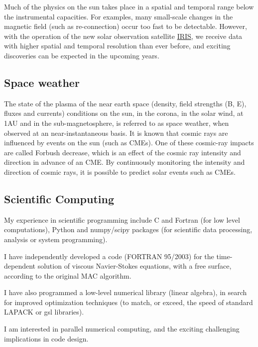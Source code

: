 Much of the physics on the sun takes place in a spatial and temporal range below the instrumental capacities. For examples, many small-scale changes in the magnetic field (such as re-connection) occur too fast to be detectable. However, with the operation of the new solar observation satellite \href{http://link.springer.com/article/10.1007%2Fs11207-014-0485-y}{IRIS}, we receive data with higher spatial and temporal resolution than ever before, and exciting discoveries can be expected in the upcoming years.

\subsection{Space weather}
The state of the plasma of the near earth space (density, field strengths (B, E), fluxes and currents) conditions on the sun, in the corona, in the solar wind, at 1AU and in the sub-magnetosphere, is referred to as space weather, when observed at an near-instantaneous basis. It is known that cosmic rays are influenced by events on the sun (such as CMEs). One of these cosmic-ray impacts are called Forbush decrease, which is an effect of the cosmic ray intensity and direction in advance of an CME. By continuously monitoring the intensity and direction of cosmic rays, it is possible to predict solar events such as CMEs.

\subsection{Scientific Computing}
My experience in scientific programming include C and Fortran (for low level computations), Python and numpy/scipy packages (for scientific data processing, analysis or system programming).

I have independently developed a code (FORTRAN 95/2003) for the time-dependent solution of viscous Navier-Stokes equations, with a free surface, according to the original MAC algorithm.

I have also programmed a low-level numerical library (linear algebra), in search for improved optimization techniques (to match, or exceed, the speed of standard LAPACK or gsl libraries).

I am interested in parallel numerical computing, and the exciting challenging implications in code design.
